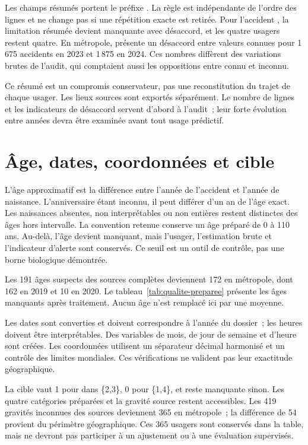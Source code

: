 Les champs résumés portent le préfixe . La règle est indépendante de l'ordre
des lignes et ne change pas si une répétition exacte est retirée. Pour l'accident
, la limitation résumée devient manquante avec désaccord, et les quatre
usagers restent quatre. En métropole,  présente un désaccord entre valeurs
connues pour 1\,675 accidents en 2023 et 1\,875 en 2024. Ces nombres diffèrent des
variations brutes de l'audit, qui comptaient aussi les oppositions entre connu et inconnu.

Ce résumé est un compromis conservateur, pas une reconstitution du trajet de chaque
usager. Les lieux sources sont exportés séparément. Le nombre de lignes et les indicateurs
de désaccord servent d'abord à l'audit~; leur forte évolution entre années devra être
examinée avant tout usage prédictif.

\section{Âge, dates, coordonnées et cible}
L'âge approximatif est la différence entre l'année de l'accident et l'année de naissance.
L'anniversaire étant inconnu, il peut différer d'un an de l'âge exact. Les naissances
absentes, non interprétables ou non entières restent distinctes des âges hors intervalle.
La convention retenue conserve un âge préparé de 0 à 110 ans. Au-delà, l'âge devient
manquant, mais l'usager, l'estimation brute et l'indicateur d'alerte sont conservés.
Ce seuil est un outil de contrôle, pas une borne biologique démontrée.

Les 191 âges suspects des sources complètes deviennent 172 en métropole, dont 162 en
2019 et 10 en 2020. Le tableau~\ref{tab:qualite-preparee} présente les âges manquants
après traitement. Aucun âge n'est remplacé ici par une moyenne.


Les dates sont converties et doivent correspondre à l'année du dossier~; les heures
doivent être interprétables. Des variables de mois, de jour de semaine et d'heure sont
créées. Les coordonnées utilisent un séparateur décimal harmonisé et un contrôle des
limites mondiales. Ces vérifications ne valident pas leur exactitude géographique.

La cible vaut 1 pour  dans \{2,3\}, 0 pour \{1,4\}, et reste manquante sinon.
Les quatre catégories préparées et la gravité source restent accessibles. Les 419 gravités
inconnues des sources deviennent 365 en métropole~; la différence de 54 provient du
périmètre géographique. Ces 365 usagers sont conservés dans la table, mais ne devront
pas participer à un ajustement ou à une évaluation supervisés.

